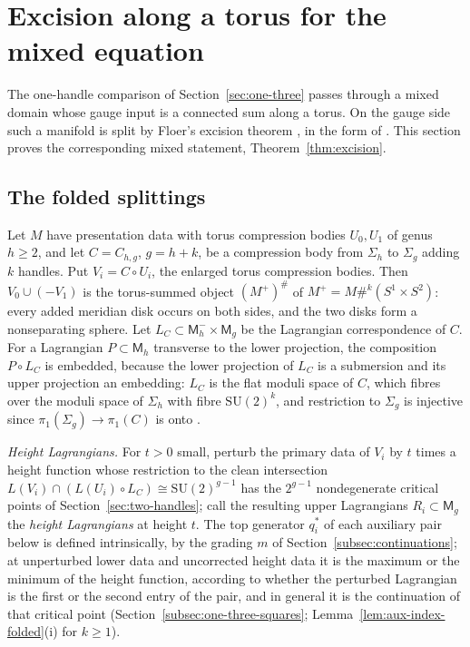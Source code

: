\documentclass[11pt]{amsart}
\theoremstyle{definition}
\theoremstyle{remark}
\theoremstyle{plain}
\numberwithin{equation}{section}
\newcommand{\SU}{\mathrm{SU}}
\newcommand{\Msf}{\mathsf{M}}
\begin{document}
\section{Excision along a torus for the mixed equation}\label{sec:torus}

The one-handle comparison of Section~\ref{sec:one-three} passes through a
mixed domain whose gauge input is a connected sum along a torus. On the
gauge side such a manifold is split by Floer's excision theorem
\cite{BD, KM-sutures}, in the form of \cite[Theorem~5.6]{KM-unknot}. This section proves the corresponding mixed statement,
Theorem~\ref{thm:excision}.

\subsection{The folded splittings}\label{subsec:folded}

Let $M$ have presentation data with torus compression bodies
$U_0,U_1$ of genus $h\ge2$, and let $C=C_{h,g}$, $g=h+k$, be a compression
body from $\Sigma_h$ to $\Sigma_g$ adding $k$ handles. Put $V_i=C\circ U_i$,
the enlarged torus compression bodies. Then $V_0\cup(-V_1)$ is the torus-summed object $(M^+)^\#$ of $M^+=M\#^k(S^1\times S^2)$: every added meridian disk
occurs on both sides, and the two disks form a nonseparating sphere. Let
$L_C\subset\Msf_h^-\times\Msf_g$ be the Lagrangian correspondence of $C$. For
a Lagrangian $P\subset\Msf_h$ transverse to the lower projection, the
composition $P\circ L_C$ is embedded, because the lower projection of $L_C$ is
a submersion and its upper projection an embedding: $L_C$ is the flat moduli
space of $C$, which fibres over the moduli space of $\Sigma_h$ with fibre
$\SU(2)^k$, and restriction to $\Sigma_g$ is injective since $\pi_1(\Sigma_g)
\to\pi_1(C)$ is onto \cite[Proposition~2.21]{DFL}.

\emph{Height Lagrangians.} For $t>0$ small, perturb the primary data of $V_i$ by
$t$ times a height function whose restriction to the clean intersection
$L(V_i)\cap(L(U_i)\circ L_C)\cong\SU(2)^{g-1}$ has the $2^{g-1}$ nondegenerate
critical points of Section~\ref{sec:two-handles}; call the resulting upper
Lagrangians $R_i\subset\Msf_g$ the \emph{height Lagrangians} at height $t$. The top generator $q_i^*$ of each auxiliary pair
below is defined intrinsically, by the grading $m$ of
Section~\ref{subsec:continuations}; at unperturbed lower data and uncorrected height data it
is the maximum or the minimum of the height function, according to whether the perturbed
Lagrangian is the first or the second entry of the pair, and in general it is the continuation
of that critical point (Section~\ref{subsec:one-three-squares}; Lemma~\ref{lem:aux-index-folded}(i)
for $k\ge1$).
\end{document}
